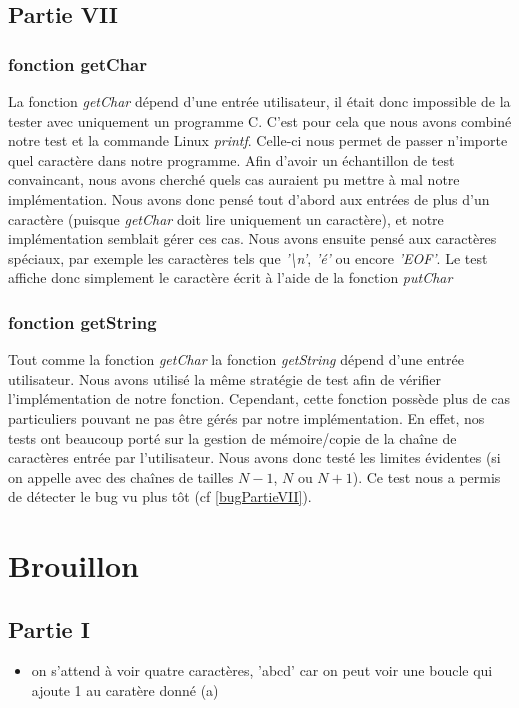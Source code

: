 \documentclass{article}
\begin{document}
\subsection{Partie VII}
\subsubsection{fonction getChar}
La fonction \textit{getChar} dépend d'une entrée utilisateur, il était donc
impossible de la tester avec uniquement un programme C. C'est pour cela que
nous avons combiné notre test et la commande Linux \textit{printf}. Celle-ci
nous permet de passer n'importe quel caractère dans notre programme. Afin
d'avoir un échantillon de test convaincant, nous avons cherché quels cas
auraient pu mettre à mal notre implémentation. Nous avons donc pensé tout
d'abord aux entrées de plus d'un caractère (puisque \textit{getChar} doit lire
uniquement un caractère), et notre implémentation semblait gérer ces cas. Nous
avons ensuite pensé aux caractères spéciaux, par exemple les caractères tels
que \textit{'\textbackslash n'}, \textit{'é'} ou encore \textit{'EOF'}. Le test
affiche donc simplement le caractère écrit à l'aide de la fonction
\textit{putChar}
\subsubsection{fonction getString}
Tout comme la fonction \textit{getChar} la fonction \textit{getString} dépend
d'une entrée utilisateur. Nous avons utilisé la même stratégie de test afin de
vérifier l'implémentation de notre fonction. Cependant, cette fonction possède
plus de cas particuliers pouvant ne pas être gérés par notre implémentation. En
effet, nos tests ont beaucoup porté sur la gestion de mémoire/copie de la
chaîne de caractères entrée par l'utilisateur. Nous avons donc testé les
limites évidentes (si on appelle avec des chaînes de tailles $N-1$, $N$ ou
$N+1$). Ce test nous a permis de détecter le bug vu plus tôt (cf
\ref{bugPartieVII}).
\section{Brouillon}
\subsection{Partie I}
\begin{itemize}
    \item on s'attend à voir quatre caractères, 'abcd' car on peut voir une boucle qui
          ajoute 1 au caratère donné (a)

\end{itemize}
\end{document}
